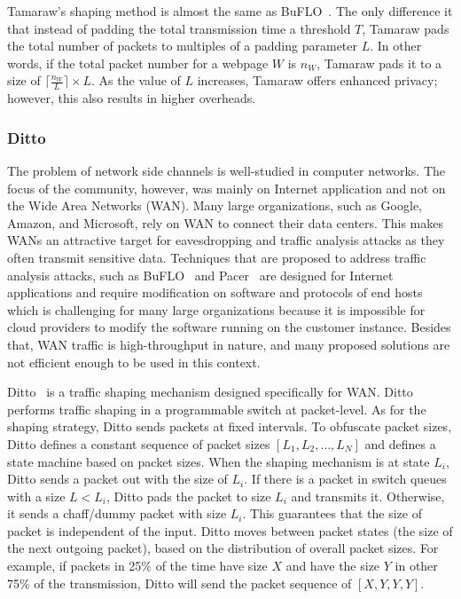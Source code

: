 Tamaraw's shaping method is almost the same as BuFLO~\cite{dyer2012peek}. The only difference it that instead of padding the total transmission time a threshold $T$, Tamaraw pads the total number of packets to multiples of a padding parameter $L$.
In other words, if the total packet number for a webpage $W$ is $n_W$, Tamaraw pads it to a size of $\lceil \frac{n_W}{L} \rceil \times L$.
As the value of $L$ increases, Tamaraw offers enhanced privacy; however, this also results in higher overheads.


\subsubsection{Ditto}
The problem of network side channels is well-studied in computer networks.
The focus of the community, however, was mainly on Internet application and not on the Wide Area Networks (WAN).
Many large organizations, such as Google, Amazon, and Microsoft, rely on WAN to connect their data centers.
This makes WANs an attractive target for eavesdropping and traffic analysis attacks as they often transmit sensitive data.
Techniques that are proposed to address traffic analysis attacks, such as BuFLO~\cite{cai2014cs} and Pacer~\cite{mehta2022pacer} are designed for Internet applications and require modification on software and protocols of end hosts which is challenging for many large organizations because it is impossible for cloud providers to modify the software running on the customer instance.
Besides that, WAN traffic is high-throughput in nature, and many proposed solutions are not efficient enough to be used in this context.

Ditto~\cite{meier2022ditto} is a traffic shaping mechanism designed specifically for WAN.
Ditto performs traffic shaping in a programmable switch at packet-level.
As for the shaping strategy, Ditto sends packets at fixed intervals.
To obfuscate packet sizes, Ditto defines a constant sequence of packet sizes $[L_1, L_2, \dots, L_N]$ and defines a state machine based on packet sizes.
When the shaping mechanism is at state $L_i$, Ditto sends a packet out with the size of $L_i$.
If there is a packet in switch queues with a size $L < L_i$, Ditto pads the packet to size $L_i$ and transmits it.
Otherwise, it sends a chaff/dummy packet with size $L_i$.
This guarantees that the size of packet is independent of the input.
Ditto moves between packet states (the size of the next outgoing packet), based on the distribution of overall packet sizes.
For example, if packets in 25\% of the time have size $X$ and have the size $Y$ in other 75\% of the transmission, Ditto will send the packet sequence of $[X, Y, Y, Y]$.

